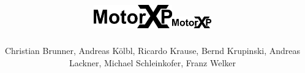 \documentclass[14pt]{beamer}
\title{\includegraphics[height=1cm]{../images/MotorXP}}
\author{Christian Brunner, Andreas Kölbl, Ricardo Krause, Bernd Krupinski, Andreas Lackner, Michael Schleinkofer, Franz Welker}
\begin{document}
\begingroup
\makeatletter
\setlength{\hoffset}{-.5\beamer@sidebarwidth}
\makeatother
\begin{frame}[plain]
  \titlepage
\end{frame}
\endgroup
  \title{\includegraphics[height=0.5cm]{../images/MotorXP}}
  \author{}





\end{document}
